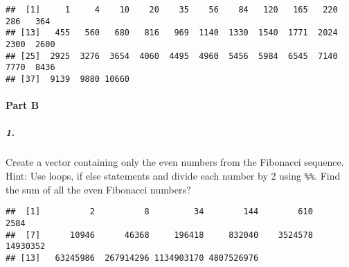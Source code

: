 \documentclass[
]{article}
\newenvironment{Shaded}{\begin{snugshade}}{\end{snugshade}}
\newcommand{\CommentTok}[1]{\textcolor[rgb]{0.56,0.35,0.01}{\textit{#1}}}
\newcommand{\ControlFlowTok}[1]{\textcolor[rgb]{0.13,0.29,0.53}{\textbf{#1}}}
\newcommand{\DecValTok}[1]{\textcolor[rgb]{0.00,0.00,0.81}{#1}}
\newcommand{\KeywordTok}[1]{\textcolor[rgb]{0.13,0.29,0.53}{\textbf{#1}}}
\newcommand{\NormalTok}[1]{#1}
\newcommand{\OperatorTok}[1]{\textcolor[rgb]{0.81,0.36,0.00}{\textbf{#1}}}
\newcommand{\StringTok}[1]{\textcolor[rgb]{0.31,0.60,0.02}{#1}}
\begin{document}
\begin{verbatim}
##  [1]     1     4    10    20    35    56    84   120   165   220   286   364
## [13]   455   560   680   816   969  1140  1330  1540  1771  2024  2300  2600
## [25]  2925  3276  3654  4060  4495  4960  5456  5984  6545  7140  7770  8436
## [37]  9139  9880 10660
\end{verbatim}

\hypertarget{part-b}{%
\paragraph{Part B}\label{part-b}}

\hypertarget{section}{%
\subparagraph{1.}\label{section}}

Create a vector containing only the even numbers from the Fibonacci
sequence. Hint: Use loops, if else statements and divide each number by
2 using \texttt{\%\%}. Find the sum of all the even Fibonacci numbers?

\begin{Shaded}
\end{Shaded}

\begin{verbatim}
##  [1]          2          8         34        144        610       2584
##  [7]      10946      46368     196418     832040    3524578   14930352
## [13]   63245986  267914296 1134903170 4807526976
\end{verbatim}
\end{document}
